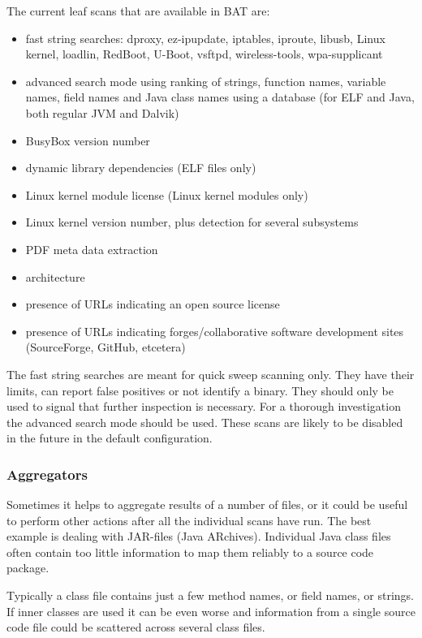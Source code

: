 \documentclass[10pt]{article}
\begin{document}
The current leaf scans that are available in BAT are:

\begin{itemize}
\item fast string searches: dproxy, ez-ipupdate, iptables, iproute, libusb,
Linux kernel, loadlin, RedBoot, U-Boot, vsftpd, wireless-tools, wpa-supplicant
\item advanced search mode using ranking of strings, function names, variable
names, field names and Java class names using a database (for ELF and Java,
both regular JVM and Dalvik)
\item BusyBox version number
\item dynamic library dependencies (ELF files only)
\item Linux kernel module license (Linux kernel modules only)
\item Linux kernel version number, plus detection for several subsystems
\item PDF meta data extraction
\item architecture
\item presence of URLs indicating an open source license
\item presence of URLs indicating forges/collaborative software development
sites (SourceForge, GitHub, etcetera)
\end{itemize}

The fast string searches are meant for quick sweep scanning only. They have
their limits, can report false positives or not identify a binary. They should
only be used to signal that further inspection is necessary. For a thorough
investigation the advanced search mode should be used. These scans are likely
to be disabled in the future in the default configuration.

\subsubsection{Aggregators}

Sometimes it helps to aggregate results of a number of files, or it could be
useful to perform other actions after all the individual scans have run. The
best example is dealing with JAR-files (Java ARchives). Individual Java class
files often contain too little information to map them reliably to a source
code package.

Typically a class file contains just a few method names, or field names, or
strings. If inner classes are used it can be even worse and information from a
single source code file could be scattered across several class files.
\end{document}
